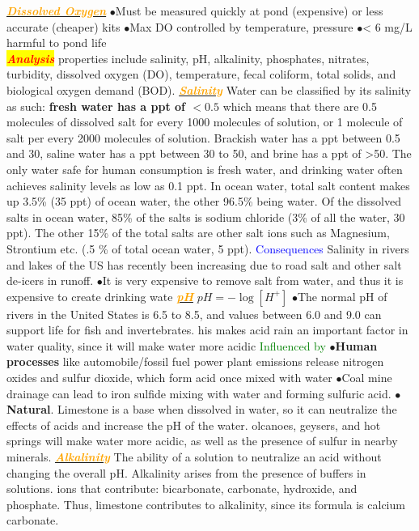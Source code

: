 \documentclass{article}
\newcommand{\ddd}{$\bullet$}
\newcommand{\red}[1]{\textcolor{red}{#1}}
\newcommand{\green}[1]{\textcolor{green}{#1}}
\newcommand{\blue}[1]{\textcolor{blue}{#1}}
\newcommand{\orange}[1]{\textcolor{orange}{#1}}
\newcommand{\mysection}[1]{\colorbox{yellow}{\textbf{\textit{\red{#1}}}}}
\newcommand{\mysubsection}[1]{\underline{\textbf{{\textit{\orange{#1}}}}}}
\newcommand{\mysubsub}[1]{{{\green{#1}}}}
\newcommand{\mysubsubsub}[1]{{{\blue{#1}}}}
\begin{document}
\begin{multicols*}{4}
        \mysubsection{Dissolved Oxygen}
            \ddd Must be measured quickly at pond (expensive) or less accurate (cheaper) kits
            \ddd Max DO controlled by temperature, pressure
            \ddd < 6 mg/L harmful to pond life
    \\
    \mysection{Analysis}
        properties include salinity, pH, alkalinity, phosphates, nitrates, turbidity, dissolved oxygen (DO), temperature, fecal coliform, total solids, and biological oxygen demand (BOD). 
        \mysubsection{Salinity}
            Water can be classified by its salinity as such: \textbf{fresh water has a ppt of $< 0.5$} which means that there are 0.5 molecules of dissolved salt for every 1000 molecules of solution, or 1 molecule of salt per every 2000 molecules of solution. Brackish water has a ppt between 0.5 and 30, saline water has a ppt between 30 to 50, and brine has a ppt of >50. The only water safe for human consumption is fresh water, and drinking water often achieves salinity levels as low as 0.1 ppt. In ocean water, total salt content makes up 3.5\% (35 ppt) of ocean water, the other 96.5\% being water. Of the dissolved salts in ocean water, 85\% of the salts is sodium chloride (3\% of all the water, 30 ppt). The other 15\% of the total salts are other salt ions such as Magnesium, Strontium etc. (.5 \% of total ocean water, 5 ppt). 
            \mysubsubsub{Consequences}
                Salinity in rivers and lakes of the US has recently been increasing due to road salt and other salt de-icers in runoff. \ddd It is very expensive to remove salt from water, and thus it is expensive to create drinking wate
        \mysubsection{pH}
            $pH = - \log [H^+]$
            \ddd  The normal pH of rivers in the United States is 6.5 to 8.5, and values between 6.0 and 9.0 can support life for fish and invertebrates. his makes acid rain an important factor in water quality, since it will make water more acidic
            \mysubsub{Influenced by} 
            \ddd \textbf{Human processes} like automobile/fossil fuel power plant emissions release nitrogen oxides and sulfur dioxide, which form acid once mixed with water
            \ddd  Coal mine drainage can lead to iron sulfide mixing with water and forming sulfuric acid.
            \ddd \textbf{Natural}. Limestone is a base when dissolved in water, so it can neutralize the effects of acids and increase the pH of the water. olcanoes, geysers, and hot springs will make water more acidic, as well as the presence of sulfur in nearby minerals.
        \mysubsection{Alkalinity}
            The ability of a solution to neutralize an acid without changing the overall pH. Alkalinity arises from the presence of buffers in solutions. ions that contribute: bicarbonate, carbonate, hydroxide, and phosphate. Thus, limestone contributes to alkalinity, since its formula is calcium carbonate.

\end{multicols*}
\end{document}
